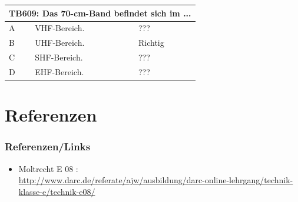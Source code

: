 \begin{frame}
	\begin{center}
	\begin{tabular}{|l|l|l|}
		\hline
		\multicolumn{3}{|c|}{\textbf{TB609: Das 70-cm-Band befindet sich im ...}}\\
		\hline
		A & VHF-Bereich. & ???     \\ \hline
		B & UHF-Bereich. & Richtig \\ \hline
		C & SHF-Bereich. & ???     \\ \hline
		D & EHF-Bereich. & ???     \\ \hline
	\end{tabular}
	\end{center}
\end{frame}

\section*{Referenzen}
\begin{frame}
    \frametitle{Referenzen/Links}
    
    \footnotesize
    \begin{itemize}
        \item Moltrecht E 08 : \\
              \url{http://www.darc.de/referate/ajw/ausbildung/darc-online-lehrgang/technik-klasse-e/technik-e08/}      
    \end{itemize}

\end{frame}



